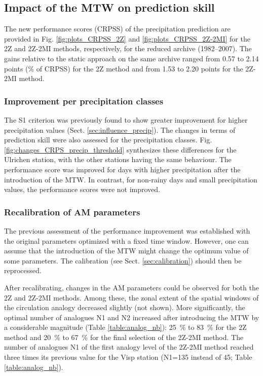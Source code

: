 \documentclass[hess, manuscript]{copernicus}
\begin{document}
	
	\subsection{Impact of the MTW on prediction skill}
	\label{sec:influence_scores}
	
	The new performance scores (CRPSS) of the precipitation prediction are provided in Fig. \ref{fig:plots_CRPSS_2Z} and \ref{fig:plots_CRPSS_2Z-2MI} for the 2Z and 2Z-2MI methods, respectively, for the reduced archive (1982--2007). The gains relative to the static approach on the same archive ranged from 0.57 to 2.14 points (\% of CRPSS) for the 2Z method and from 1.53 to 2.20 points for the 2Z-2MI method. 
	
	
	\subsubsection{Improvement per precipitation classes}
	\label{sec:improvement_CRPSS_precip_threshold}
	
	The S1 criterion was previously found to show greater improvement for higher precipitation values (Sect. \ref{sec:influence_precip}). The changes in terms of prediction skill were also assessed for the precipitation classes. Fig. \ref{fig:changes_CRPS_precip_threshold} synthesizes these differences for the Ulrichen station, with the other stations having the same behaviour. The performance score was improved for days with higher precipitation after the introduction of the MTW. In contrast, for non-rainy days and small precipitation values, the performance scores were not improved.
	
	
	\subsubsection{Recalibration of AM parameters}
	\label{sec:recalibration}
	
	The previous assessment of the performance improvement was established with the original parameters optimized with a fixed time window. However, one can assume that the introduction of the MTW might change the optimum value of some parameters. The calibration (see Sect. \ref{sec:calibration}) should then be reprocessed.
	
	After recalibrating, changes in the AM parameters could be observed for both the 2Z and 2Z-2MI methods. Among these, the zonal extent of the spatial windows of the circulation analogy decreased slightly (not shown). More significantly, the optimal number of analogues N1 and N2 increased after introducing the MTW by a considerable magnitude (Table \ref{table:analog_nb}): 25~\% to 83~\% for the 2Z method and 20~\% to 67~\% for the final selection of the 2Z-2MI method. The number of analogues N1 of the first analogy level of the 2Z-2MI method reached three times its previous value for the Visp station (N1=135 instead of 45; Table \ref{table:analog_nb}). 
	
\end{document}
